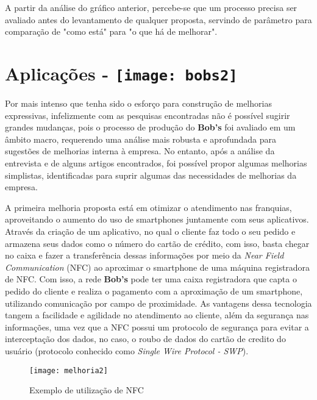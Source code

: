 		A partir da análise do gráfico anterior, percebe-se que um processo precisa ser avaliado antes do levantamento de qualquer proposta, servindo de parâmetro para comparação de "como está"  para "o que há de melhorar".

	\section[Aplicações]{Aplicações - \texttt{[image: bobs2]}}
	\label{sec:melhorias_aplicacoes}


		Por mais intenso que tenha sido o esforço para construção de melhorias expressivas, infelizmente com as pesquisas encontradas não é possível sugirir grandes mudanças, pois o processo de produção do \textbf{Bob's} foi avaliado em um âmbito macro, requerendo uma análise mais robusta e aprofundada para sugestões de melhorias interna à empresa. No entanto, após a análise da entrevista e de alguns artigos encontrados, foi possível propor algumas melhorias simplistas, identificadas para suprir algumas das necessidades de melhorias da empresa.

		A primeira melhoria proposta está em otimizar o atendimento nas franquias, aproveitando o aumento do uso de smartphones juntamente com seus aplicativos. Através da criação de um aplicativo, no qual o cliente faz todo o seu pedido e armazena seus dados como o número do cartão de crédito, com isso, basta chegar no caixa e fazer a transferência dessas informações por meio da \emph{Near Field Communication} (NFC) ao aproximar o smartphone de uma máquina registradora de NFC. Com isso, a rede \textbf{Bob's} pode ter uma caixa registradora que capta o pedido do cliente e realiza o pagamento com a aproximação de um smartphone, utilizando comunicação por campo de proximidade. As vantagens dessa tecnologia tangem a facilidade e agilidade no atendimento ao cliente, além da segurança nas informações, uma vez que a NFC possui um protocolo de segurança para evitar a interceptação dos dados, no caso, o roubo de dados do cartão de credito do usuário (protocolo conhecido como \emph{Single Wire Protocol - SWP}).

		\newpage
		\begin{figure}[h]
			\centering
			\texttt{[image: melhoria2]}
			\caption[Exemplo de utilização de NFC]{Exemplo de utilização de NFC}
			\label{fig:melhoria2}
		\end{figure}

